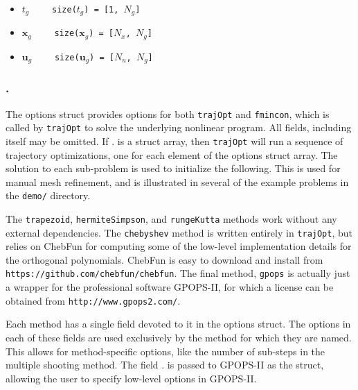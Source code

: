 \begin{itemize} \setlength\itemsep{-0.1em}
\item {}\tc{ = }$t_g \qquad$ \texttt{size($t_g$) = [1, $N_g$]}   
\item {}\tc{ = }$\bm{x}_g \qquad$ \texttt{size($\bm{x}_g$) = [$N_x$, $N_g$]}  
\item {}\tc{ = }$\bm{u}_g \qquad$ \texttt{size($\bm{u}_g$) = [$N_u$, $N_g$]}
\end{itemize}



\subsubsection*{.}

The options struct provides options for both \texttt{trajOpt} and \texttt{fmincon}, which is called by \texttt{trajOpt} to solve the underlying nonlinear program. All fields, including  itself may be omitted. If . is a struct array, then \texttt{trajOpt} will run a sequence of trajectory optimizations, one for each element of the options struct array. The solution to each sub-problem is used to initialize the following. This is used for manual mesh refinement, and is illustrated in several of the example problems in the \texttt{demo/} directory. 

\par The \texttt{trapezoid}, \texttt{hermiteSimpson}, and \texttt{rungeKutta} methods work without any external dependencies. The \texttt{chebyshev} method is written entirely in \texttt{trajOpt}, but relies on ChebFun\cite{Driscoll2014} for computing some of the low-level implementation details for the orthogonal polynomials. ChebFun is easy to download and install from \texttt{https://github.com/chebfun/chebfun}. The final method, \texttt{gpops} is actually just a wrapper for the professional software GPOPS-II\cite{Patterson2013}, for which a license can be obtained from \texttt{http://www.gpops2.com/}.

\par Each method has a single field devoted to it in the options struct. The options in each of these fields are used exclusively by the method for which they are named. This allows for method-specific options, like the number of sub-steps in the multiple shooting method. The field . is passed to GPOPS-II as the  struct, allowing the user to specify low-level options in GPOPS-II. 

